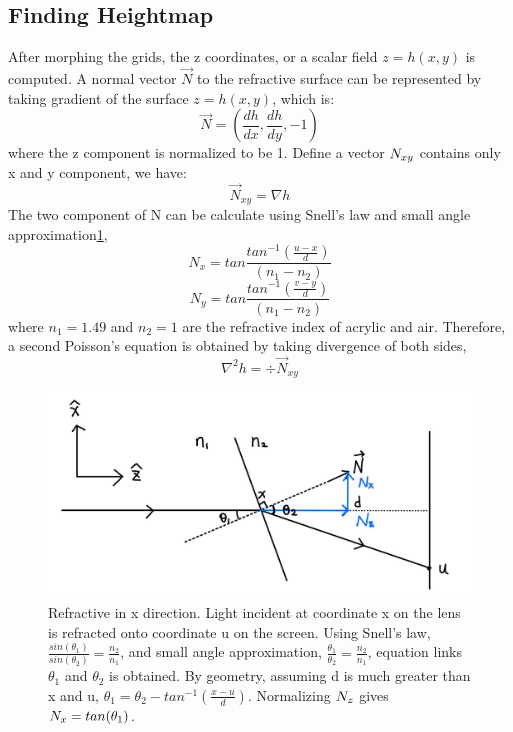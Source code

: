 \documentclass[10pt,two column]{configuration/unoesc}
\begin{document}
\subsection{Finding Heightmap}
After morphing the grids, the z coordinates, or a scalar field $z=h(x,y)$ is computed. A normal vector $\vec N$ to the refractive surface can be represented by taking gradient of the surface $z=h(x,y)$, which is:
\begin{equation}
    \vec N = (\frac{dh}{dx},\frac{dh}{dy},-1)
\end{equation}
where the z component is normalized to be 1. Define a vector $\MakeUppercase N_{xy}$ contains only x and y component, we have:
\begin{equation}
    \vec N_{xy} = \nabla h
\end{equation}
The two component of N can be calculate using Snell's law and small angle approximation\ref{fig:3},
\begin{equation}
    N_{x} = tan \frac{tan^{-1}(\frac{u-x}{d})}{(n_1-n_2)}
\end{equation}
\begin{equation} 
    N_{y} = tan \frac{tan^{-1}(\frac{v-y}{d})}{(n_1-n_2)}
\end{equation}
where $n_1 = 1.49$ and $n_2 = 1$ are the refractive index of acrylic and air. Therefore, a second Poisson's equation is obtained by taking divergence of both sides, 
\begin{equation}
    \nabla^2 h = \div{{\vec N_{xy}}}
\end{equation}

\begin{figure}[t!]
\centering
\includegraphics[width=1.0\linewidth]{figures/figure3.jpg} 
\caption{Refractive in x direction. Light incident at coordinate x on the lens is refracted onto coordinate u on the screen. Using Snell's law, $\frac{sin(\theta _1)}{sin(\theta _2)}=\frac{n_2}{n_1}$, and small angle approximation, $\frac{\theta_1}{\theta_2}=\frac{n_2}{n_1}$, equation links $\theta_1$ and $\theta_2$ is obtained. By geometry, assuming d is much greater than x and u, $\theta_1 = \theta_2 - tan^{-1}(\frac{x-u}{d})$. Normalizing $\MakeUppercase N_{z}$ gives $\MakeUppercase N_{x} = tan(\theta_1)$.}
\label{fig:3}
\end{figure}
\end{document}
